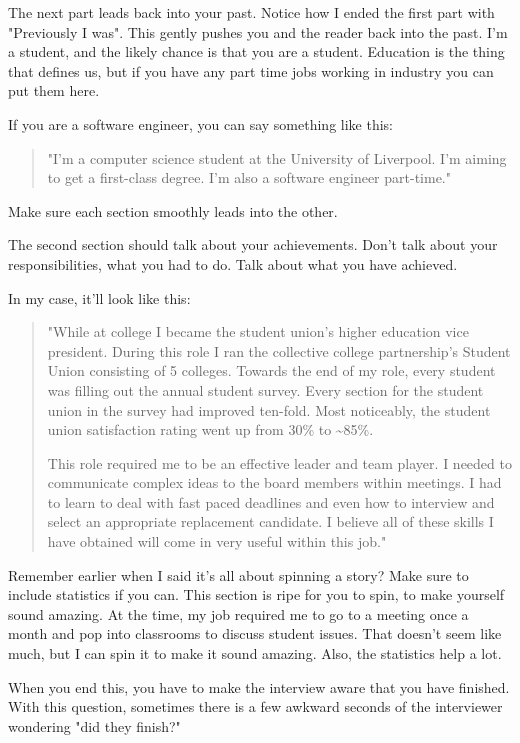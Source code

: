 \documentclass{article}
\begin{document}
The next part leads back into your past. Notice how I ended the first
part with "Previously I was". This gently pushes you and the reader back
into the past. I'm a student, and the likely chance is that you are a
student. Education is the thing that defines us, but if you have any
part time jobs working in industry you can put them here.

If you are a software engineer, you can say something like this:
\begin{quote}
"I'm a computer science student at the University of Liverpool. I'm
aiming to get a first-class degree. I'm also a software engineer
part-time."    
\end{quote}

Make sure each section smoothly leads into the other.

The second section should talk about your achievements. Don't talk about
your responsibilities, what you had to do. Talk about what you have
achieved.

In my case, it'll look like this:
\begin{quote}
 "While at college I became the student union's higher education vice
president. During this role I ran the collective college partnership's
Student Union consisting of 5 colleges. Towards the end of my role,
every student was filling out the annual student survey. Every section
for the student union in the survey had improved ten-fold. Most
noticeably, the student union satisfaction rating went up from 30\% to
\textasciitilde85\%.

This role required me to be an effective leader and team player. I
needed to communicate complex ideas to the board members within
meetings. I had to learn to deal with fast paced deadlines and even how
to interview and select an appropriate replacement candidate. I believe
all of these skills I have obtained will come in very useful within this
job."  
\end{quote}


Remember earlier when I said it's all about spinning a story? Make sure
to include statistics if you can. This section is ripe for you to spin,
to make yourself sound amazing. At the time, my job required me to go to
a meeting once a month and pop into classrooms to discuss student
issues. That doesn't seem like much, but I can spin it to make it sound
amazing. Also, the statistics help a lot.

When you end this, you have to make the interview aware that you have
finished. With this question, sometimes there is a few awkward seconds
of the interviewer wondering "did they finish?"
\end{document}
